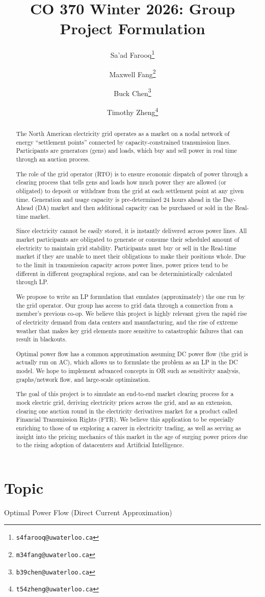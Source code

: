 \documentclass[11pt]{article}
\title{CO 370 Winter 2026: Group Project Formulation}
\author{
Sa'ad Farooq\thanks{\texttt{s4farooq@uwaterloo.ca}} \and
Maxwell Fang\thanks{\texttt{m34fang@uwaterloo.ca}} \and
Buck Chen\thanks{\texttt{b39chen@uwaterloo.ca}} \and
Timothy Zheng\thanks{\texttt{t54zheng@uwaterloo.ca}}
}
\begin{document}
\maketitle

\section{Topic}
Optimal Power Flow (Direct Current Approximation)

\begin{abstract}
The North American electricity grid operates as a market on a nodal network of energy ``settlement points'' connected by capacity-constrained transmission lines. Participants are generators (gens) and loads, which buy and sell power in real time through an auction process.

The role of the grid operator (RTO) is to ensure economic dispatch of power through a clearing process that tells gens and loads how much power they are allowed (or obligated) to deposit or withdraw from the grid at each settlement point at any given time. Generation and usage capacity is pre-determined 24 hours ahead in the Day-Ahead (DA) market and then additional capacity can be purchased or sold in the Real-time market. 

Since electricity cannot be easily stored, it is instantly delivered across power lines. All market participants are obligated to generate or consume their scheduled amount of electricity to maintain grid stability. Participants must buy or sell in the Real-time market if they are unable to meet their obligations to make their positions whole. Due to the limit in transmission capacity across power lines, power prices tend to be different in different geographical regions, and can be deterministically calculated through LP. 

We propose to write an LP formulation that emulates (approximately) the one run by the grid operator. Our group has access to grid data through a connection from a member's previous co-op. We believe this project is highly relevant given the rapid rise of electricity demand from data centers and manufacturing, and the rise of extreme weather that makes key grid elements more sensitive to catastrophic failures that can result in blackouts.

Optimal power flow has a common approximation assuming DC power flow (the grid is actually run on AC), which allows us to formulate the problem as an LP in the DC model. We hope to implement advanced concepts in OR such as sensitivity analysis, graphs/network flow, and large-scale optimization.

The goal of this project is to simulate an end-to-end market clearing process for a mock electric grid, deriving electricity prices across the grid, and as an extension, clearing one auction round in the electricity derivatives market for a product called Financial Transmission Rights (FTR). We believe this application to be especially enriching to those of us exploring a career in electricity trading, as well as serving as insight into the pricing mechanics of this market in the age of surging power prices due to the rising adoption of datacenters and Artificial Intelligence.
\end{abstract}
\end{document}
